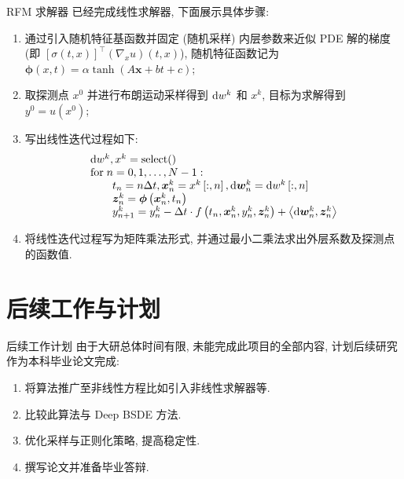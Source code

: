 \documentclass[aspectratio=169,10pt]{beamer}
\def\dif{\mathinner{\mathrm{d}}\hphantom{\mskip-\thinmuskip}}
\begin{document}
    \begin{frame}{RFM 求解器}
        已经完成线性求解器, 下面展示具体步骤:
        \begin{enumerate}
            \item 通过引入随机特征基函数并固定 (随机采样) 内层参数来近似 PDE 解的梯度 (即 $\left[\sigma\left(t, x\right)\right]^{\top} \left(\nabla_{x} u \right)\left(t, x\right)$), 随机特征函数记为 $\boldsymbol{\phi}\left(x, t\right) = \alpha\tanh\left(A \boldsymbol{x} + bt + c\right)$;
            \item 取探测点 $x^{0}$ 并进行布朗运动采样得到 $\dif w^{k}$ 和 $x^{k}$, 目标为求解得到 $y^{0} = u\left(x^{0}\right)$;
            \item 写出线性迭代过程如下:
            \begin{equation*}
                \begin{array}{l}
                    \dif w^{k}, x^{k} = \mathrm{select()} \\
                    \mathrm{for} \; n = 0, 1, \ldots, N-1: \\
                    \quad \quad t_{n} = n \Delta t, \boldsymbol{x}_{n}^{k} = x^{k}\left[:,n\right], \dif \boldsymbol{w}_{n}^{k} = \dif w^{k}\left[:,n\right] \\
                    \quad \quad \boldsymbol{z}_{n}^{k} = \boldsymbol{\phi}\left(\boldsymbol{x}_{n}^{k}, t_{n}\right) \\
                    \quad \quad y_{n+1}^{k} = y_{n}^{k} - \Delta t \cdot f\left(t_{n}, \boldsymbol{x}_{n}^{k}, y_{n}^{k}, \boldsymbol{z}_{n}^{k}\right) + \left\langle \dif \boldsymbol{w}_{n}^{k}, \boldsymbol{z}_{n}^{k} \right\rangle \\
                \end{array}
            \end{equation*}
            \item 将线性迭代过程写为矩阵乘法形式, 并通过最小二乘法求出外层系数及探测点的函数值.
        \end{enumerate}
    \end{frame}

    \section{后续工作与计划}
    \begin{frame}{后续工作计划}
        由于大研总体时间有限, 未能完成此项目的全部内容, 计划后续研究作为本科毕业论文完成:
        \begin{enumerate}
            \item 将算法推广至非线性方程比如引入非线性求解器等.
            \item 比较此算法与 Deep BSDE 方法.
            \item 优化采样与正则化策略, 提高稳定性.
            \item 撰写论文并准备毕业答辩.
        \end{enumerate}
    \end{frame}
\end{document}
